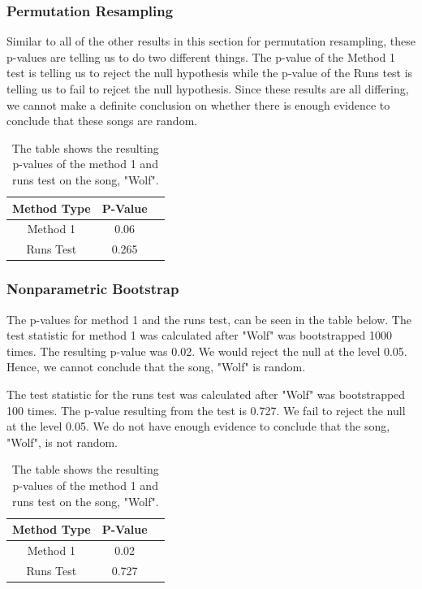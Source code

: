 \documentclass[12pt, letterpaper]{article}
\begin{document}
\subsubsection{Permutation Resampling}
Similar to all of the other results in this section for permutation resampling, these p-values are telling us to do two different things. The p-value of the Method 1 test is telling us to reject the null hypothesis while the p-value of the Runs test is telling us to fail to rejcet the null hypothesis. Since these results are all differing, we cannot make a definite conclusion on whether there is enough evidence to conclude that these songs are random.
\begin{table}[h]
\begin{center}
\begin{tabular}{|c|c|c|}
\hline
\textbf{Method Type} & P-Value  \\
\hline
Method 1 & 0.06 \\
\hline
Runs Test & 0.265 \\ 
\hline
\end{tabular}
\end{center}
\caption{The table shows the resulting p-values of the method 1 and runs test on the song, "Wolf".}
\label{fig: P-values for "Wolf": Permutation Resampling}
\end{table}

\subsubsection{Nonparametric Bootstrap}
The p-values for method 1 and the runs test, can be seen in the table below. The test statistic for method 1 was calculated after "Wolf" was bootstrapped 1000 times. The resulting p-value was 0.02. We would reject the null at the level 0.05. Hence, we cannot conclude that the song, "Wolf" is random. 

The test statistic for the runs test was calculated after "Wolf" was bootstrapped 100 times. The p-value resulting from the test is 0.727. We fail to reject the null at the level 0.05. We do not have enough evidence to conclude that the song, "Wolf", is not random.
\begin{table}[!h]
\begin{center}
\begin{tabular}{|c|c|c|}
\hline
\textbf{Method Type} & P-Value \\
\hline
Method 1 & 0.02  \\
\hline
Runs Test & 0.727 \\ 
\hline
\end{tabular}
\end{center}
\caption{The table shows the resulting p-values of the method 1 and runs test on the song, "Wolf".}
\label{fig: P-values for "Wolf": Nonparametric Bootstrap}
\end{table}
\end{document}
